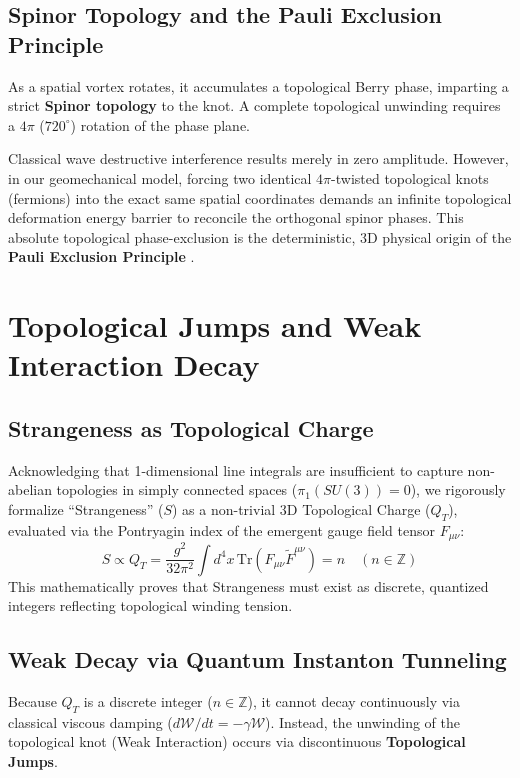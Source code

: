 \documentclass[reprint,amsmath,amssymb,aps,prd]{revtex4-2}
\begin{document}
\subsection{Spinor Topology and the Pauli Exclusion Principle}
As a spatial vortex rotates, it accumulates a topological Berry phase, imparting a strict \textbf{Spinor topology} to the knot. A complete topological unwinding requires a $4\pi$ ($720^\circ$) rotation of the phase plane. 

Classical wave destructive interference results merely in zero amplitude. However, in our geomechanical model, forcing two identical $4\pi$-twisted topological knots (fermions) into the exact same spatial coordinates demands an infinite topological deformation energy barrier to reconcile the orthogonal spinor phases. This absolute topological phase-exclusion is the deterministic, 3D physical origin of the \textbf{Pauli Exclusion Principle} \cite{Pauli1925}.

\section{Topological Jumps and Weak Interaction Decay}

\subsection{Strangeness as Topological Charge}
Acknowledging that 1-dimensional line integrals are insufficient to capture non-abelian topologies in simply connected spaces ($\pi_1(SU(3)) = 0$), we rigorously formalize ``Strangeness'' ($S$) as a non-trivial 3D Topological Charge ($Q_T$), evaluated via the Pontryagin index of the emergent gauge field tensor $F_{\mu\nu}$:
\begin{equation}
S \propto Q_T = \frac{g^2}{32\pi^2} \int d^4x \, \mathrm{Tr}(F_{\mu\nu} \tilde{F}^{\mu\nu}) = n \quad (n \in \mathbb{Z})
\end{equation}
This mathematically proves that Strangeness must exist as discrete, quantized integers reflecting topological winding tension.

\subsection{Weak Decay via Quantum Instanton Tunneling}
Because $Q_T$ is a discrete integer ($n \in \mathbb{Z}$), it cannot decay continuously via classical viscous damping ($d\mathcal{W}/dt = -\gamma \mathcal{W}$). Instead, the unwinding of the topological knot (Weak Interaction) occurs via discontinuous \textbf{Topological Jumps}.
\end{document}
